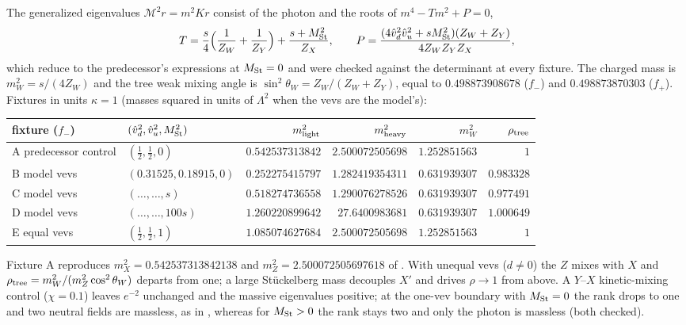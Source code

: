\documentclass[11pt,letterpaper]{article}
\newcommand{\Mb}{\mathcal M}
\newcommand{\Lam}{\Lambda}
\begin{document}
The generalized eigenvalues $\Mb^2r=m^2Kr$ consist of the photon and the roots of $m^4-Tm^2+P=0$,
\begin{equation}
T=\frac s4\Bigl(\frac1{Z_W}+\frac1{Z_Y}\Bigr)+\frac{s+M_{\rm St}^2}{Z_X},\qquad
P=\frac{(4\hat v_d^2\hat v_u^2+sM_{\rm St}^2)(Z_W+Z_Y)}{4Z_WZ_YZ_X},
\end{equation}
which reduce to the predecessor's expressions at $M_{\rm St}=0$ and were checked against the determinant at every fixture. The charged mass is $m_W^2=s/(4Z_W)$ and the tree weak mixing angle is $\sin^2\theta_W=Z_W/(Z_W+Z_Y)$, equal to $0.498873908678$ ($f_-$) and $0.498873870303$ ($f_+$). Fixtures in units $\kappa=1$ (masses squared in units of $\Lam^2$ when the vevs are the model's):

\begin{center}\small
\begin{tabular}{@{}llrrrr@{}}
\toprule
fixture ($f_-$) & $(\hat v_d^2,\hat v_u^2,M_{\rm St}^2)$ & $m^2_{\rm light}$ & $m^2_{\rm heavy}$ & $m_W^2$ & $\rho_{\rm tree}$\\
\midrule
A predecessor control & $(\tfrac12,\tfrac12,0)$ & $0.542537313842$ & $2.500072505698$ & $1.252851563$ & $1$\\
B model vevs & $(0.31525,0.18915,0)$ & $0.252275415797$ & $1.282419354311$ & $0.631939307$ & $0.983328$\\
C model vevs & $(\ldots,\ldots,s)$ & $0.518274736558$ & $1.290076278526$ & $0.631939307$ & $0.977491$\\
D model vevs & $(\ldots,\ldots,100s)$ & $1.260220899642$ & $27.6400983681$ & $0.631939307$ & $1.000649$\\
E equal vevs & $(\tfrac12,\tfrac12,1)$ & $1.085074627684$ & $2.500072505698$ & $1.252851563$ & $1$\\
\bottomrule
\end{tabular}
\end{center}
Fixture A reproduces $m_X^2=0.542537313842138$ and $m_Z^2=2.500072505697618$ of \cite{neutral}. With unequal vevs ($d\ne0$) the $Z$ mixes with $X$ and $\rho_{\rm tree}=m_W^2/(m_Z^2\cos^2\theta_W)$ departs from one; a large Stückelberg mass decouples $X'$ and drives $\rho\to1$ from above. A $Y$--$X$ kinetic-mixing control ($\chi=0.1$) leaves $e^{-2}$ unchanged and the massive eigenvalues positive; at the one-vev boundary with $M_{\rm St}=0$ the rank drops to one and two neutral fields are massless, as in \cite{neutral}, whereas for $M_{\rm St}>0$ the rank stays two and only the photon is massless (both checked).
\end{document}
